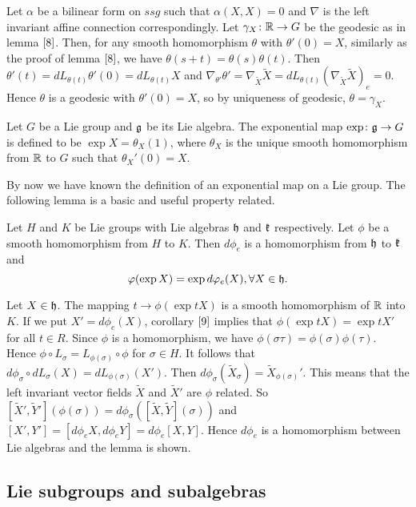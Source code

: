 \bproof
Let $\alpha$ be a bilinear form on $ssg$ such that
$\alpha(X,X)=0$ and $\nabla$ is the left invariant affine
connection correspondingly. Let $\gamma_X\colon{\mathbb R}\to G$ be the
geodesic as in lemma $\ref{8}$. Then, for any smooth homomorphism
$\theta$ with $\theta'(0)=X$, similarly as the proof of lemma
$\ref{8}$, we have $\theta(s+t)=\theta(s)\theta(t)$. Then
$\theta'(t)=dL_{\theta(t)}\theta'(0)=dL_{\theta(t)}X$ and
$\nabla_{\theta'}\theta'=\nabla_{\tilde X}\tilde
X=dL_{\theta(t)}(\nabla_{\tilde X}\tilde X)_e=0$. Hence $\theta$
is a geodesic with $\theta'(0)=X$, so by uniqueness of geodesic,
$\theta=\gamma_X$.
\eproof
\begin{definition}
	Let $G$ be a Lie group and ${\mathfrak g}$ be its Lie algebra. The
	exponential map $\exp\colon{\mathfrak g}\to G$ is defined to be $\exp X =
	\theta_X(1)$, where $\theta_X$ is the unique smooth
	homomorphism from ${\mathbb R}$ to $G$ such that $\theta_X'(0) = X$.
\end{definition}

By now we have known the definition of an exponential map on a
Lie group. The following lemma is a basic and useful property
related.

\begin{lemma}
	Let $H$ and $K$ be Lie groups with Lie algebras ${\mathfrak h}$ and
	${\mathfrak k}$ respectively. Let $\phi$ be a smooth homomorphism from
	$H$ to $K$. Then $d\phi_e$ is a homomorphism from ${\mathfrak h}$ to
	${\mathfrak k}$ and
	\[\varphi(\exp X)=\exp d\varphi_e(X), \forall X\in {\mathfrak h}.\]
\end{lemma}
\bproof
Let $X \in {\mathfrak h}$. The mapping $t \to \phi(\exp tX)$ is a smooth
homomorphism of ${\mathbb R}$ into $K$. If we put $X' = d\phi_e(X)$,
corollary $\ref{9}$ implies that $\phi(\exp tX) = \exp tX'$ for
all $t \in R$. Since $\phi $ is a homomorphism, we have
$\phi(\sigma\tau) = \phi(\sigma)\phi(\tau)$. Hence $\phi\circ
L_{\sigma}=L_{\phi(\sigma)}\circ\phi$ for $\sigma \in H$. It
follows that $d\phi_{\sigma}\circ
dL_{\sigma}(X)=dL_{\phi(\sigma)}(X')$. Then
$d\phi_{\sigma}(\tilde X_{\sigma})=\tilde X_{\phi(\sigma)}'$.
This means that the left invariant vector fields $\tilde{X}$ and
$\tilde X'$ are $\phi $ related. So $[\tilde X', \tilde
Y'](\phi(\sigma))=d\phi_{\sigma}([\tilde X, \tilde Y](\sigma))$
and $[X', Y']=[d\phi_eX, d\phi_eY]=d\phi_e[X, Y]$. Hence
$d\phi_e$ is a homomorphism between Lie algebras and the lemma is
shown.
\eproof
\subsection{Lie subgroups and subalgebras}


